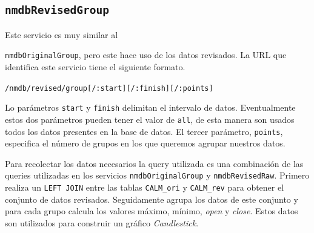 	\subsection{\texttt{nmdbRevisedGroup}}
		Este servicio es muy similar al {\texttt{nmdbOriginalGroup}, pero este hace uso de los datos revisados. La URL que identifica este
		servicio tiene el siguiente formato.
			\begin{center} \texttt{/nmdb/revised/group[/:start][/:finish][/:points]}  \end{center}
		Lo parámetros \texttt{start} y \texttt{finish} delimitan el intervalo de datos. Eventualmente estos dos parámetros pueden tener el
		valor de \texttt{all}, de esta manera son usados todos los datos presentes en la base de datos. El tercer parámetro, \texttt{points},
		especifica el número de grupos en los que queremos agrupar nuestros datos.
		\par
		Para recolectar los datos necesarios la query utilizada es una combinación de las queries utilizadas en los servicios
		\texttt{nmdbOriginalGroup} y \texttt{nmdbRevisedRaw}. Primero realiza un \texttt{LEFT JOIN} entre las tablas \texttt{CALM\_ori} 
		y \texttt{CALM\_rev} para obtener el conjunto de datos revisados. Seguidamente agrupa los datos de este conjunto y para cada grupo
		calcula los valores máximo, mínimo, \emph{open} y \emph{close}. Estos datos son utilizados para construir un gráfico \emph{Candlestick}.
}
